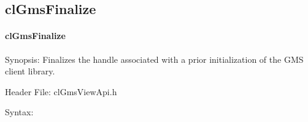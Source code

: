 \begin{flushleft}
\subsection{clGmsFinalize}
\hypertarget{pagegms102}{}\paragraph{cl\-Gms\-Finalize}\label{pagegms102}
\begin{Desc}
\item[Synopsis:]Finalizes the handle associated with a prior initialization of the GMS client library.\end{Desc}
\begin{Desc}
\item[Header File:]clGmsViewApi.h\end{Desc}
\begin{Desc}
\item[Syntax:]


\end{Desc}
\end{flushleft}
